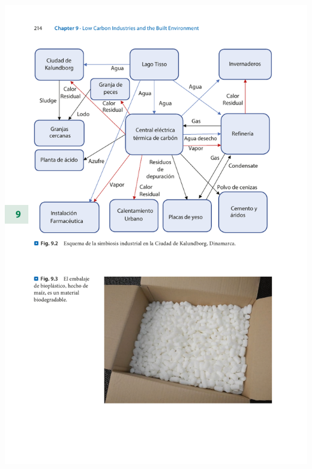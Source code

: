 \documentclass[runningheads]{llncs}
\begin{document}
\includegraphics[scale=0.95]{9(2).pdf}
\end{document}

